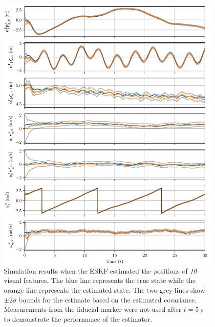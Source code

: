 \begin{figure}
  \centering
  \includegraphics[width=6.5in]{plots/single_run_with_lms}
  \caption[ESKF Simulation Results Using 10 Visual Features]{Simulation results when the ESKF estimated the positions of \emph{10} visual
  features. The blue line represents the true state while the orange line
  represents the estimated state. The two grey lines show $\pm 2 \sigma$ bounds for
  the estimate based on the estimated covariance. Measurements from the fiducial
  marker were not used after $t = 5$ s
  to demonstrate the performance of the estimator.}
  \label{fig:with_lms}
\end{figure}



